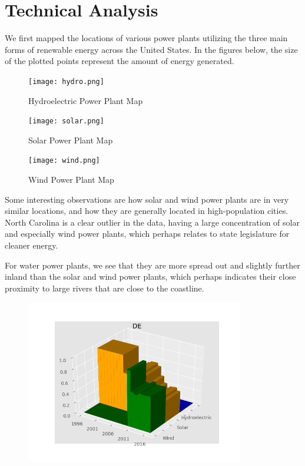 \documentclass[12pt]{article}
\begin{document}
\section{Technical Analysis}
We first mapped the locations of various power plants utilizing the three main forms of renewable energy across the United States. In the figures below, the size of the plotted points represent the amount of energy generated. 

\begin{figure}[!htbp]
\centering
\texttt{[image: hydro.png]}
\caption{Hydroelectric Power Plant Map}
\end{figure}

\begin{figure}[!htbp]
\centering
\texttt{[image: solar.png]}
\caption{Solar Power Plant Map}
\end{figure}

\begin{figure}[!htbp]
\centering
\texttt{[image: wind.png]}
\caption{Wind Power Plant Map}
\end{figure}

\newpage 

Some interesting observations are how solar and wind power plants are in very similar locations, and how they are generally located in high-population cities. North Carolina is a clear outlier in the data, having a large concentration of solar and especially wind power plants, which perhaps relates to state legislature for cleaner energy. 

For water power plants, we see that they are more spread out and slightly further inland than the solar and wind power plants, which perhaps indicates their close proximity to large rivers that are close to the coastline.

\newpage
\begin{figure}[!htbp]
\centering
\includegraphics[width=0.85\textwidth]{DE.png}
\end{figure}
\end{document}

